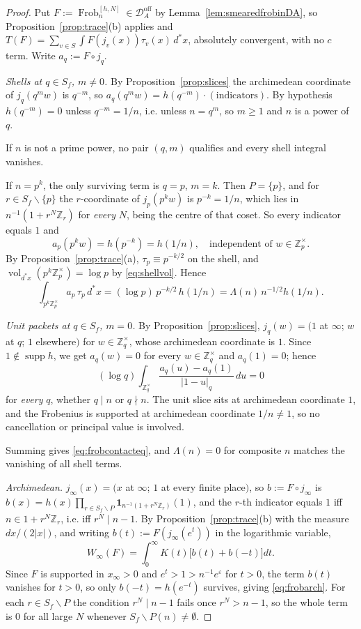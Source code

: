 \documentclass[11pt]{amsart}
\theoremstyle{definition}
\theoremstyle{remark}
\newcommand{\Z}{\mathbb Z}
\newcommand{\Frob}{\operatorname{Frob}}
\newcommand{\supp}{\operatorname{supp}}
\newcommand{\vol}{\operatorname{vol}}
\newcommand{\Doff}{\mathcal D_A^{\mathrm{off}}}
\begin{document}
\begin{proof}
Put $F:=\Frob_n^{[h,N]}\in\Doff$ by Lemma~\ref{lem:smearedfrobinDA}, so
Proposition~\ref{prop:trace}(b) applies and
$T(F)=\sum_{v\in S}\int F(j_v(x))\tau_v(x)\,d^*x$, absolutely convergent, with
no $c$ term. Write $a_q:=F\circ j_q$.

\emph{Shells at $q\in S_f$, $m\ne0$.} By Proposition~\ref{prop:slices} the
archimedean coordinate of $j_q(q^mw)$ is $q^{-m}$, so
$a_q(q^mw)=h(q^{-m})\cdot(\text{indicators})$. By hypothesis $h(q^{-m})=0$
unless $q^{-m}=1/n$, i.e. unless $n=q^m$, so $m\ge1$ and $n$ is a power of $q$.

If $n$ is not a prime power, no pair $(q,m)$ qualifies and every shell integral
vanishes.

If $n=p^k$, the only surviving term is $q=p$, $m=k$. Then $P=\{p\}$, and for
$r\in S_f\smallsetminus\{p\}$ the $r$-coordinate of $j_p(p^kw)$ is
$p^{-k}=1/n$, which lies in $n^{-1}(1+r^N\Z_r)$ for \emph{every} $N$, being the
centre of that coset. So every indicator equals $1$ and
\[
  a_p(p^kw)=h(p^{-k})=h(1/n),\quad\text{independent of }w\in\Z_p^\times .
\]
By Proposition~\ref{prop:trace}(a), $\tau_p\equiv p^{-k/2}$ on the shell, and
$\vol_{d^*x}(p^k\Z_p^\times)=\log p$ by \eqref{eq:shellvol}. Hence
\[
  \int_{p^k\Z_p^\times}a_p\,\tau_p\,d^*x=(\log p)\,p^{-k/2}\,h(1/n)
   =\Lambda(n)\,n^{-1/2}h(1/n).
\]

\emph{Unit packets at $q\in S_f$, $m=0$.} By Proposition~\ref{prop:slices},
$j_q(w)=(1$ at $\infty$; $w$ at $q$; $1$ elsewhere$)$ for $w\in\Z_q^\times$,
whose archimedean coordinate is $1$. Since $1\notin\supp h$, we get $a_q(w)=0$
for every $w\in\Z_q^\times$ and $a_q(1)=0$; hence
\[
  (\log q)\int_{\Z_q^\times}\frac{a_q(u)-a_q(1)}{|1-u|_q}\,du=0
\]
for \emph{every} $q$, whether $q\mid n$ or $q\nmid n$. The unit slice sits at
archimedean coordinate $1$, and the Frobenius is supported at archimedean
coordinate $1/n\ne1$, so no cancellation or principal value is involved.

Summing gives \eqref{eq:frobcontacteq}, and $\Lambda(n)=0$ for composite $n$
matches the vanishing of all shell terms.

\emph{Archimedean.} $j_\infty(x)=(x$ at $\infty$; $1$ at every finite place$)$,
so $b:=F\circ j_\infty$ is
$b(x)=h(x)\prod_{r\in S_f\smallsetminus P}\mathbf 1_{n^{-1}(1+r^N\Z_r)}(1)$, and
the $r$-th indicator equals $1$ iff $n\in1+r^N\Z_r$, i.e. iff $r^N\mid n-1$.
By Proposition~\ref{prop:trace}(b) with the measure $dx/(2|x|)$, and
writing $b(t):=F(j_\infty(e^t))$ in the logarithmic variable,
\[
  W_\infty(F)=\int_0^\infty K(t)\bigl[b(t)+b(-t)\bigr]dt .
\]
Since $F$ is supported in $x_\infty>0$ and $e^t>1>n^{-1}e^\varepsilon$ for
$t>0$, the term $b(t)$ vanishes for $t>0$, so only $b(-t)=h(e^{-t})$ survives,
giving \eqref{eq:frobarch}. For each $r\in S_f\smallsetminus P$ the condition
$r^N\mid n-1$ fails once $r^N>n-1$, so the whole term is $0$ for all large $N$
whenever $S_f\smallsetminus P(n)\ne\emptyset$.
\end{proof}
\end{document}
